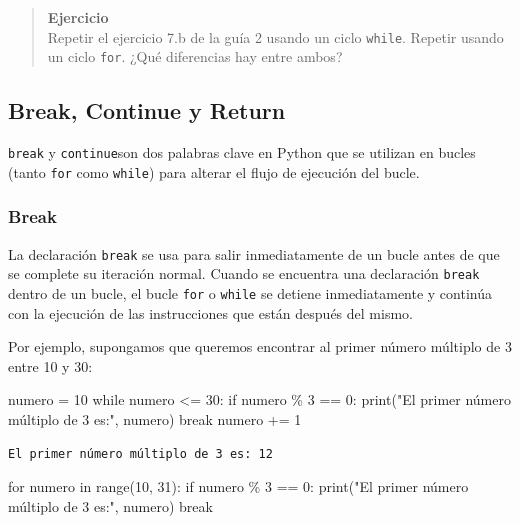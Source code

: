 \documentclass[
  letterpaper,
  DIV=11,
  numbers=noendperiod]{scrreprt}
\newenvironment{Shaded}{\begin{snugshade}}{\end{snugshade}}
\newcommand{\BuiltInTok}[1]{\textcolor[rgb]{0.00,0.23,0.31}{#1}}
\newcommand{\ControlFlowTok}[1]{\textcolor[rgb]{0.00,0.23,0.31}{#1}}
\newcommand{\DecValTok}[1]{\textcolor[rgb]{0.68,0.00,0.00}{#1}}
\newcommand{\KeywordTok}[1]{\textcolor[rgb]{0.00,0.23,0.31}{#1}}
\newcommand{\NormalTok}[1]{\textcolor[rgb]{0.00,0.23,0.31}{#1}}
\newcommand{\OperatorTok}[1]{\textcolor[rgb]{0.37,0.37,0.37}{#1}}
\newcommand{\StringTok}[1]{\textcolor[rgb]{0.13,0.47,0.30}{#1}}
\begin{document}
\begin{quote}
\textbf{Ejercicio}\\
Repetir el ejercicio 7.b de la guía 2 usando un ciclo \texttt{while}.
Repetir usando un ciclo \texttt{for}. ¿Qué diferencias hay entre ambos?
~
\end{quote}

\subsection{Break, Continue y Return}\label{break-continue-y-return}

\texttt{break} y \texttt{continue}son dos palabras clave en Python que
se utilizan en bucles (tanto \texttt{for} como \texttt{while}) para
alterar el flujo de ejecución del bucle.

\subsubsection{Break}\label{break}

La declaración \texttt{break} se usa para salir inmediatamente de un
bucle antes de que se complete su iteración normal. Cuando se encuentra
una declaración \texttt{break} dentro de un bucle, el bucle \texttt{for}
o \texttt{while} se detiene inmediatamente y continúa con la ejecución
de las instrucciones que están después del mismo.

Por ejemplo, supongamos que queremos encontrar al primer número múltiplo
de 3 entre 10 y 30:

\begin{Shaded}
\begin{Highlighting}[]
\NormalTok{numero }\OperatorTok{=} \DecValTok{10}
\ControlFlowTok{while}\NormalTok{ numero }\OperatorTok{\textless{}=} \DecValTok{30}\NormalTok{:}
  \ControlFlowTok{if}\NormalTok{ numero }\OperatorTok{\%} \DecValTok{3} \OperatorTok{==} \DecValTok{0}\NormalTok{:}
      \BuiltInTok{print}\NormalTok{(}\StringTok{"El primer número múltiplo de 3 es:"}\NormalTok{, numero)}
      \ControlFlowTok{break}
\NormalTok{  numero }\OperatorTok{+=} \DecValTok{1}
\end{Highlighting}
\end{Shaded}

\begin{verbatim}
El primer número múltiplo de 3 es: 12
\end{verbatim}

\begin{Shaded}
\begin{Highlighting}[]
\ControlFlowTok{for}\NormalTok{ numero }\KeywordTok{in} \BuiltInTok{range}\NormalTok{(}\DecValTok{10}\NormalTok{, }\DecValTok{31}\NormalTok{):}
  \ControlFlowTok{if}\NormalTok{ numero }\OperatorTok{\%} \DecValTok{3} \OperatorTok{==} \DecValTok{0}\NormalTok{:}
      \BuiltInTok{print}\NormalTok{(}\StringTok{"El primer número múltiplo de 3 es:"}\NormalTok{, numero)}
      \ControlFlowTok{break}
\end{Highlighting}
\end{Shaded}
\end{document}
